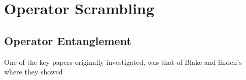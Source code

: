 \section{Operator Scrambling}
\subsection{Operator Entanglement}

One of the key papers originally investigated, was that of Blake and linden's where they showed
